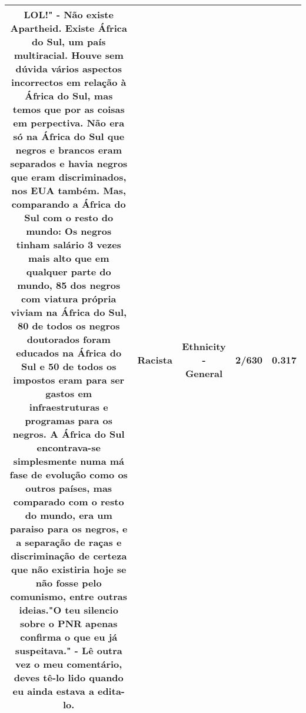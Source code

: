 \documentclass[11pt]{article}
\newlength\mylength
\begin{document}
\begin{center}
\begin{longtable}{|C{.65\mylength}|C{.30\mylength}|C{.12\mylength}|C{.12\mylength}|C{.12\mylength}|}
LOL!" - Não existe Apartheid. Existe África do Sul, um país multiracial. Houve sem dúvida vários aspectos incorrectos em relação à África do Sul, mas temos que por as coisas em perpectiva. Não era só na África do Sul que negros e brancos eram separados e havia negros que eram discriminados, nos EUA também. Mas, comparando a África do Sul com o resto do mundo: Os negros tinham salário 3 vezes mais alto que em qualquer parte do mundo, 85 dos negros com viatura própria viviam na África do Sul, 80 de todos os negros doutorados foram educados na África do Sul e 50 de todos os impostos eram para ser gastos em infraestruturas e programas para os negros. A África do Sul encontrava-se simplesmente numa má fase de evolução como os outros países, mas comparado com o resto do mundo, era um paraiso para os negros, e a separação de raças e discriminação de certeza que não existiria hoje se não fosse pelo comunismo, entre outras ideias."O teu silencio sobre o PNR apenas confirma o que eu já suspeitava." - Lê outra vez o meu comentário, deves tê-lo lido quando eu ainda estava a edita-lo.\normalsize   & Racista & Ethnicity - General & 2/630 & 0.317 \\  \hline

\end{longtable}
\end{center}
\end{document}
